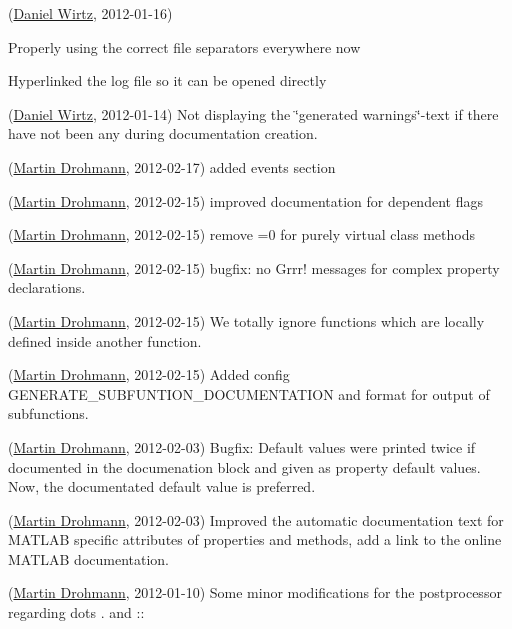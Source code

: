 \begin{DoxyRefList}
(\hyperlink{developers_dw}{Daniel Wirtz}, 2012-\/01-\/16)
\begin{DoxyItemize}
\item Properly using the correct file separators everywhere now
\item Hyperlinked the log file so it can be opened directly
\end{DoxyItemize}

(\hyperlink{developers_dw}{Daniel Wirtz}, 2012-\/01-\/14) Not displaying the \char`\"{}generated warnings\char`\"{}-\/text if there have not been any during documentation creation. 
\item[\label{changelog1_3__changelog1_3000004}%
\hypertarget{changelog1_3__changelog1_3000004}{}%
Class \hyperlink{class_m_file_scanner}{M\+File\+Scanner} ](\hyperlink{developers_md}{Martin Drohmann}, 2012-\/02-\/17) added events section

(\hyperlink{developers_md}{Martin Drohmann}, 2012-\/02-\/15) improved documentation for dependent flags

(\hyperlink{developers_md}{Martin Drohmann}, 2012-\/02-\/15) remove =0 for purely virtual class methods

(\hyperlink{developers_md}{Martin Drohmann}, 2012-\/02-\/15) bugfix\+: no Grrr! messages for complex property declarations.

(\hyperlink{developers_md}{Martin Drohmann}, 2012-\/02-\/15) We totally ignore functions which are locally defined inside another function.

(\hyperlink{developers_md}{Martin Drohmann}, 2012-\/02-\/15) Added config G\+E\+N\+E\+R\+A\+T\+E\+\_\+\+S\+U\+B\+F\+U\+N\+T\+I\+O\+N\+\_\+\+D\+O\+C\+U\+M\+E\+N\+T\+A\+T\+I\+O\+N and format for output of subfunctions.

(\hyperlink{developers_md}{Martin Drohmann}, 2012-\/02-\/03) Bugfix\+: Default values were printed twice if documented in the documenation block and given as property default values. Now, the documentated default value is preferred.

(\hyperlink{developers_md}{Martin Drohmann}, 2012-\/02-\/03) Improved the automatic documentation text for M\+A\+T\+L\+A\+B specific attributes of properties and methods, add a link to the online M\+A\+T\+L\+A\+B documentation.

(\hyperlink{developers_md}{Martin Drohmann}, 2012-\/01-\/10) Some minor modifications for the postprocessor regarding dots \textquotesingle{}.\textquotesingle{} and \textquotesingle{}\+:\+:\textquotesingle{}


\end{DoxyRefList}
